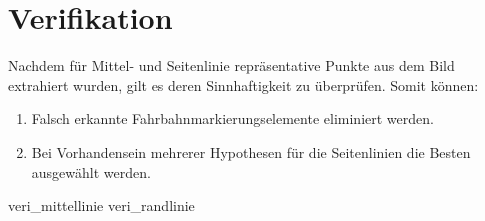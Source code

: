 \section{Verifikation \dcsecondauthorshort}
\label{ssec:fahrspurerkennung:riverflow:verifikation}
Nachdem für Mittel- und Seitenlinie repräsentative Punkte aus dem Bild extrahiert wurden, gilt es deren Sinnhaftigkeit zu überprüfen. Somit können:
\begin{enumerate}
\item Falsch erkannte Fahrbahnmarkierungselemente eliminiert werden.
\item Bei Vorhandensein mehrerer Hypothesen für die Seitenlinien die Besten ausgewählt werden.
\end{enumerate}

{veri_mittellinie}
{veri_randlinie}
